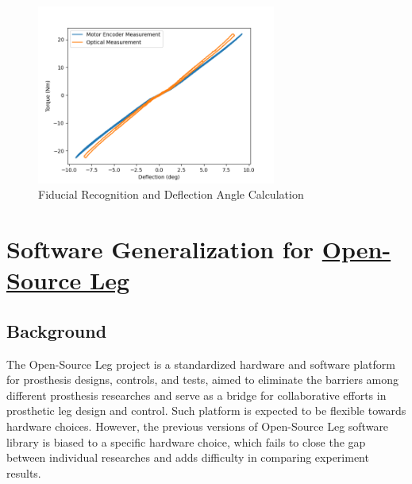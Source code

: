 \documentclass[12pt]{article}
\begin{document}
\begin{itemize}
\begin{figure}[H]
        \centering
        \includegraphics[width=0.7\textwidth]{portfolio/deflection_calc.png}
        \caption{Fiducial Recognition and Deflection Angle Calculation}
        \label{Stiffness Measurement}

    \end{figure}

\end{itemize}




\newpage

\section{Software Generalization for \href{https://www.opensourceleg.org/}{Open-Source Leg}}


\subsection{Background}



The Open-Source Leg project is a standardized hardware and software platform for prosthesis designs, controls, and tests, aimed to eliminate the barriers among different prosthesis researches and serve as a bridge for collaborative efforts in prosthetic leg design and control. Such platform is expected to be flexible towards hardware choices. However, the previous versions of Open-Source Leg software library is biased to a specific hardware choice, which fails to close the gap between individual researches and adds difficulty in comparing experiment results. 
\end{document}

